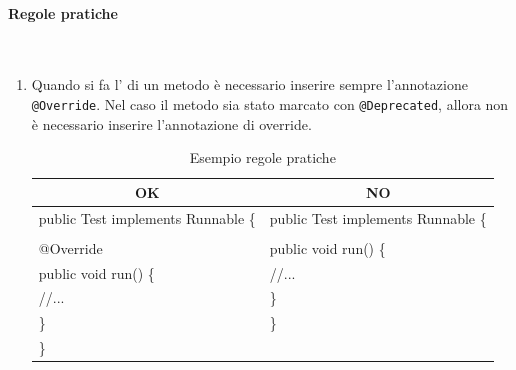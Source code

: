\paragraph{Regole pratiche}\mbox{}\\[0.4cm]
\begin{enumerate}
	\item Quando si fa l’ di un metodo è necessario inserire sempre l’annotazione \texttt{@Override}. Nel caso il metodo sia stato marcato con \texttt{@Deprecated}, allora non è necessario inserire l’annotazione di override.
	\begin{table} [H]
		\begin{center}
			\begin{tabular}{ | l | l |}
				\multicolumn{1}{c}{\textbf{OK}}&\multicolumn{1}{c}{\textbf{NO}}\\ 
				\hline
				public Test implements Runnable \{& public Test implements Runnable \{\\
				&\\
				\hspace{0.5cm}@Override & \hspace{0.5cm}public void run() \{ \\
				\hspace{0.5cm}public void run() \{& \hspace{1cm}//...\\
				\hspace{1cm}//... & \hspace{0.5cm}\} \\
				\hspace{0.5cm}\}&\}\\
				\}&\\
				\hline
			\end{tabular}
		\end{center}
		\caption{Esempio regole pratiche}
	\end{table}
		

\end{enumerate}
